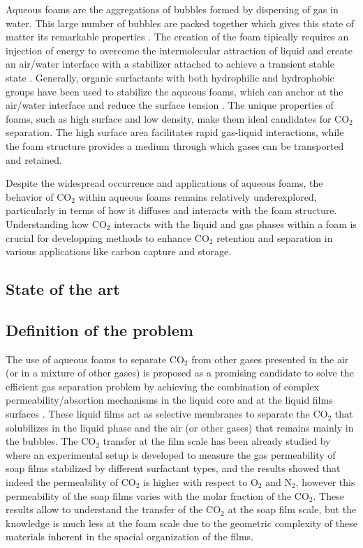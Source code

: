 \documentclass{article}
\begin{document}
Aqueous foams are the aggregations of bubbles formed by dispersing of gas in water. This large number of bubbles are packed together which gives this state of matter its remarkable properties \cite[]{cantat2013foams}. The creation of the foam tipically requires an injection of energy to overcome the intermolecular attraction of liquid and create an air/water interface with a stabilizer attached to achieve a transient stable state \cite[]{langevin2017aqueous}. Generally, organic surfactants with both hydrophilic and hydrophobic groups have been used to stabilize the aqueous foams, which can anchor at the air/water interface and reduce the surface tension \cite[]{duan2023recent}. The unique properties of foams, such as high surface and low density, make them ideal candidates for CO$_2$ separation. The high surface area facilitates rapid gas-liquid interactions, while the foam structure provides a medium through which gases can be transported and retained. 

Despite the widespread occurrence and applications of aqueous foams, the behavior of CO$_2$ within aqueous foams remains relatively underexplored, particularly in terms of how it diffuses and interacts with the foam structure. Understanding how CO$_2$ interacts with the liquid and gas phases within a foam is crucial for developping methods to enhance CO$_2$ retention and separation in various applications like carbon capture and storage. 


\subsection{State of the art}


\subsection{Definition of the problem}

The use of aqueous foams to separate CO$_2$ from other gases presented in the air (or in a mixture of other gases) is proposed as a promising candidate to solve the efficient gas separation problem by achieving the combination of complex permeability/absortion mechanisms in the liquid core and at the liquid films surfaces \cite[]{hadji2024soap}. These liquid films act as selective membranes to separate the CO$_2$ that solubilizes in the liquid phase and the air (or other gases) that remains mainly in the bubbles. The CO$_2$ transfer at the film scale has been already studied by \cite{hadji2024soap} where an experimental setup is developed to measure the gas permeability of soap films stabilized by different surfactant types, and the results showed that indeed the permeability of CO$_2$ is higher with respect to O$_2$ and N$_2$, however this permeability of the soap films varies with the molar fraction of the CO$_2$. These results allow to understand the transfer of the CO$_2$ at the soap film scale, but the knowledge is much less at the foam scale due to the geometric complexity of these materials inherent in the spacial organization of the films. 
\end{document}
